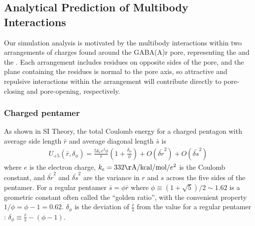 \documentclass[9pt,twocolumn,twoside,lineno]{pnas-new}
\begin{document}
\subsection{Analytical Prediction of Multibody Interactions\label{sec:theory}}
Our simulation analysis is motivated by the multibody interactions within two arrangements of charges found around the GABA(A)r pore, representing the \fivering and the \triadns. 
Each arrangement includes residues on opposite sides of the pore, and the plane containing the residues is normal to the pore axis, so attractive and repulsive interactions within the arrangement will contribute directly to pore-closing and pore-opening, respectively. %

\subsubsection*{Charged pentamer}
\newcommand{\side}{r}
\newcommand{\diag}{s}
\newcommand{\avgside}{\bar{\side}}
\newcommand{\avgdiag}{\bar{\diag}}
\newcommand{\avgsidevar}{\bar{\delta\side}^{2}}
\newcommand{\avgdiagvar}{\bar{\delta\diag}^{2}}

As shown in SI Theory, the total Coulomb energy for a charged pentagon with average side length $\avgside$ and average diagonal length $\avgdiag $ is 
\begin{eqnarray}
U_{+5}(\avgside, \delta_{\phi}) = \frac{ 5 k_{e} e^{2}\phi}{\avgside}\left( 1+ \frac{\delta_{\phi}}{\phi} \right) + O(\avgsidevar)+ O(\avgdiagvar)
 \label{eq:pentamer}
\end{eqnarray} 
where $e$ is the electron charge, $k_{e} = 332 \mathrm{\AA/kcal/mol}/e^{2}$ is the Coulomb constant, and $\avgsidevar$ and $\avgdiagvar$ are the variance in $\side$ and $\diag$ across the five sides of the pentamer.  For a regular pentamer $\avgdiag = \phi\avgside$ where $\phi \equiv \left(1 + \sqrt{5}\right)/2\sim 1.62$ is a geometric constant often called the ``golden ratio'', with the convenient property $1/\phi = \phi - 1=0.62$.  
$\delta_{\phi}$ is the deviation of $\frac{\avgside}{\avgdiag}$ from the value for a regular pentamer :  $ {\delta_{\phi}}\equiv \frac{\avgside}{\avgdiag} -(\phi - 1)$.
\end{document}
